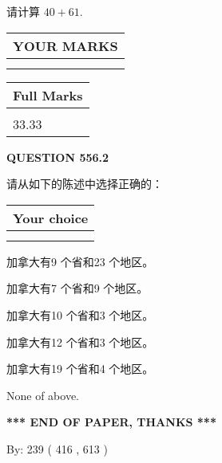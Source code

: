 \documentclass{ctexart}
\begin{document}
  
 
请计算 $ %
40 +  %
61 $.
 

 

 
  
\vspace{0.2in}
  
\noindent\begin{tabular}{|l|}
\hline
 YOUR MARKS  \\
\hline
 \\ 
 \\ 
\hline
\end{tabular}
\hspace{0.05in} \begin{tabular}{|l|}
\hline
 Full Marks  \\
\hline
 \\ 
33.33 \\
\hline
\end{tabular}
{\textbf{\Large{QUESTION
556.2 
}}}
  
  
请从如下的陈述中选择正确的：
  
  
\noindent\hspace{3.0in} \begin{tabular}{|l|}
\hline
Your choice \\
\hline
 \\ 
 \\ 
\hline
\end{tabular}
  
  
 
 
加拿大有9 个省和23 个地区。
 
 
加拿大有7 个省和9 个地区。
 
 
加拿大有10 个省和3 个地区。
 
 
加拿大有12 个省和3 个地区。
 
 
加拿大有19 个省和4 个地区。
 
 
 None of above.
 
 
   
   
 \vspace{0.2in}
 
   
   
   
   
\vspace{1.0in} 
{\textbf{\large{ *** END OF PAPER, THANKS *** }}} 
   
   
\hspace{1.0in} By: 
 239 ( 416 ,  613 )
   
\end{document}
